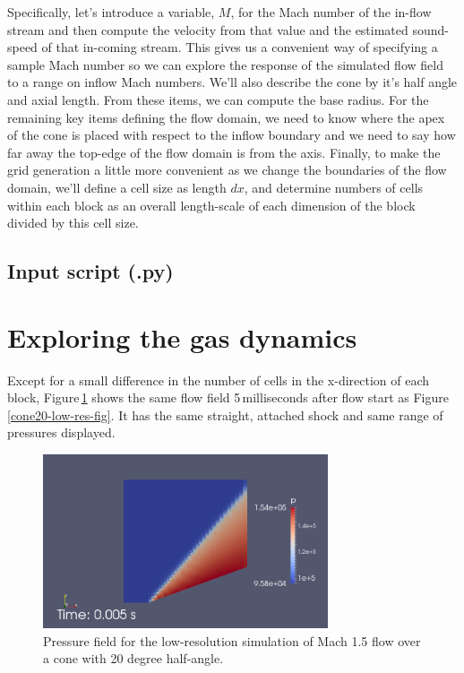 \medskip
Specifically, let's introduce a variable, $M$, for the Mach number of the in-flow stream and
then compute the velocity from that value and the estimated sound-speed of that in-coming stream.
This gives us a convenient way of specifying a sample Mach number so we can explore the response 
of the simulated flow field to a range on inflow Mach numbers.
We'll also describe the cone by it's half angle and axial length.
From these items, we can compute the base radius.
For the remaining key items defining the flow domain, we need to know where the apex of the cone 
is placed with respect to the inflow boundary and we need to say how far away the top-edge 
of the flow domain is from the axis.
Finally, to make the grid generation a little more convenient as we change the boundaries 
of the flow domain, we'll define a cell size as length $dx$, and determine numbers of cells 
within each block as an overall length-scale of each dimension of the block 
divided by this cell size. 

\subsection{Input script (.py)}
%

\noindent\topbar

\bottombar
      
\section{Exploring the gas dynamics}
%
Except for a small difference in the number of cells in the x-direction of each block,
Figure\,\ref{conep-20-degrees-fig} shows the same flow field 5\,milliseconds after flow start
as Figure\,\ref{cone20-low-res-fig}.
It has the same straight, attached shock and same range of pressures displayed.

\begin{figure}[htbp]
\begin{center}
\includegraphics[width=0.75\textwidth]{../2D/cone20-parametric/conep-M1p5-20degree-p-field-5ms.png}
\end{center}
\caption{Pressure field for the low-resolution simulation 
         of Mach 1.5 flow over a cone with 20 degree half-angle.}
\label{conep-20-degrees-fig}
\end{figure}

